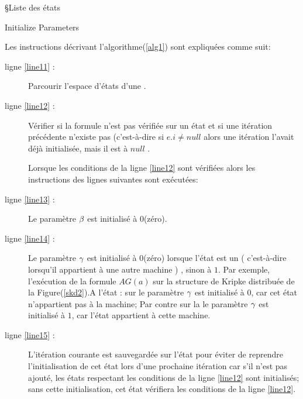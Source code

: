 \begin{algorithm}[H]\label{alg1}
\SetAlgoLined
{}
\S{Liste des états}
 \caption{Initialize Parameters}
\end{algorithm}
Les instructions décrivant l'algorithme(\ref{alg1}) sont expliquées comme suit:
\begin{description}
	\item[ligne \ref{line11} :] Parcourir l'espace d'états d'une \mi{}.
	\item[ligne \ref{line12} :] Vérifier si la formule n'est pas vérifiée sur un état et si une itération précédente n'existe pas (c'est-à-dire si $ e.i\ne null$ alors une itération l'avait déjà initialisée, mais il est à $ null$ . 
	
	Lorsque les conditions de la ligne \ref{line12} sont vérifiées alors les instructions des lignes suivantes sont exécutées:
	\item[ligne \ref{line13} :] Le paramètre $\beta{}$ est initialisé à $0$(zéro).
	\item[ligne \ref{line14} :] Le paramètre $\gamma{}$ est initialisé à $0$(zéro) lorsque l'état est un \textsl{\border{}} ( c'est-à-dire lorsqu'il appartient à une autre machine ) , sinon à $1$. Par exemple, l'exécution de la formule  \textit{$AG(a)$} sur la structure de Kripke distribuée de la Figure(\ref{skd2}).A l'état \sneuf{} : sur \mone{}  le paramètre $\gamma{}$ est initialisé à $0$, car cet état n'appartient pas à la machine;  Par contre sur la \mtwo{} le paramètre $\gamma{}$ est initialisé à $1$, car l'état appartient à cette machine.
	\item[ligne \ref{line15} :] L'itération courante est sauvegardée sur l'état pour éviter de reprendre l'initialisation de cet état lors d'une prochaine itération car s'il n'est pas ajouté, les états respectant les conditions de la ligne \ref{line12} sont initialisés; sans cette initialisation, cet état vérifiera les conditions de la ligne \ref{line12}. 
\end{description}
